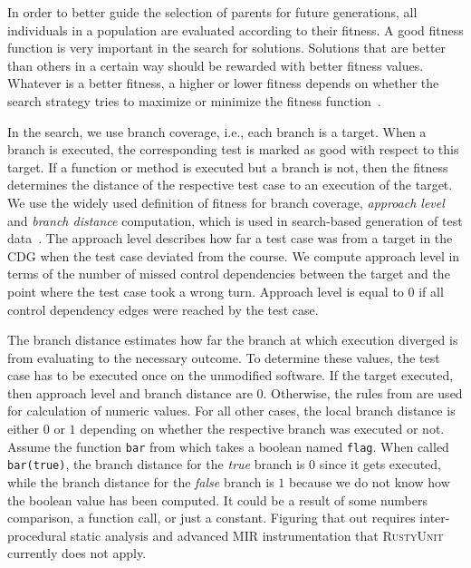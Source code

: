 \documentclass[paper=a4,%
  twoside,%
  BCOR4mm,%
  abstract=true,%
  toc=bibliography,%
  chapterprefix=true,%
  toc=bibliographynumbered,%
  open=right,%
  english,%
  pagesize=pdftex]{scrreprt}
\newcommand{\tech}{\textsc{RustyUnit}\xspace}
\newcommand{\mir}{\ac{MIR}\xspace}
\newcommand{\cdg}{\ac{CDG}\xspace}
\begin{document}
In order to better guide the selection of parents for future generations, all individuals in a population are evaluated according to their fitness. A good fitness function is very important in the search for solutions. Solutions that are better than others in a certain way should be rewarded with better fitness values. Whatever is a better fitness, a higher or lower fitness depends on whether the search strategy tries to maximize or minimize the fitness function~\cite{McMinn_2004}.

In the search, we use branch coverage, i.e., each branch is a target. When a branch is executed, the corresponding test is marked as good with respect to this target. If a function or method is executed but a branch is not, then the fitness determines the distance of the respective test case to an execution of the target. We use the widely used definition of fitness for branch coverage, \emph{approach level} and \emph{branch distance} computation, which is used in search-based generation of test data~\cite{McMinn_2004}. The approach level describes how far a test case was from a target in the \cdg when the test case deviated from the course. We compute approach level in terms of the number of missed control dependencies between the target and the point where the test case took a wrong turn. Approach level is equal to $0$ if all control dependency edges were reached by the test case.

The branch distance estimates how far the branch at which execution diverged is from evaluating to the necessary outcome. To determine these values, the test case has to be executed once on the unmodified software. If the target executed, then approach level and branch distance are $0$. Otherwise, the rules from  are used for calculation of numeric values. For all other cases, the local branch distance is either $0$ or $1$ depending on whether the respective branch was executed or not. Assume the function \texttt{bar} from  which takes a boolean named \texttt{flag}. When called \texttt{bar(true)}, the branch distance for the \emph{true} branch is $0$ since it gets executed, while the branch distance for the \emph{false} branch is $1$ because we do not know how the boolean value has been computed. It could be a result of some numbers comparison, a function call, or just a constant. Figuring that out requires inter-procedural static analysis and advanced \mir instrumentation that \tech currently does not apply. 
\end{document}
